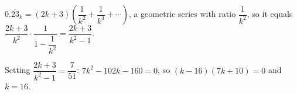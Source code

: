 $0.\overline{23}_k=(2k+3)\left(\dfrac1{k^2}+\dfrac1{k^4}+\cdots\right)$, a geometric series with ratio $\dfrac1{k^2}$, so it equals $\dfrac{2k+3}{k^2}\cdot\dfrac{1}{1-\dfrac1{k^2}}=\dfrac{2k+3}{k^2-1}$.

Setting $\dfrac{2k+3}{k^2-1}=\dfrac7{51}$: $7k^2-102k-160=0$, so $(k-16)(7k+10)=0$ and $k=\boxed{16}$.
